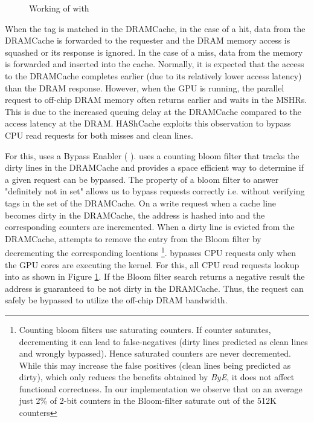 \begin{figure}[htb]
    \centering
    \scalebox{0.78}{\bloom}
    \caption{Working of \cachename with \bypassname }
    \label{fig:bye}
\end{figure}

When the tag is matched in the DRAMCache, in the case of a hit, data from the DRAMCache is forwarded to the requester and the DRAM memory access is squashed or its response is ignored. In the case of a miss, data from the memory is forwarded and inserted into the cache. Normally, it is expected that the access to the DRAMCache completes earlier (due to its relatively lower access latency) than the DRAM response. However, when the GPU is running, the parallel request to off-chip DRAM memory often returns earlier and waits in the MSHRs. This is due to the increased queuing delay at the DRAMCache compared to the access latency at the DRAM. HAShCache exploits this observation to bypass CPU read requests for both misses and clean lines.
\par For this, \cachename uses a Bypass Enabler ( \bypassname). \bypassname uses a counting bloom filter \cite{bloom,counting-bloom} that tracks the dirty lines in the DRAMCache and provides a space efficient way to determine if a given request can be bypassed. The property of a bloom filter to answer "definitely not in set" allows us to bypass requests correctly i.e. without verifying tags in the set of the DRAMCache. 
On a write request when a cache line becomes dirty in the DRAMCache, the address is hashed into \bypassname and the corresponding counters are incremented. When a dirty line is evicted from the DRAMCache, \bypassname attempts to remove the entry from the Bloom filter by decrementing the corresponding locations \footnote{Counting bloom filters use saturating counters. If counter saturates, decrementing it can lead to false-negatives (dirty lines predicted as clean lines and wrongly bypassed). Hence saturated counters are never decremented.  While this may increase the false positives (clean lines being predicted as dirty), which only reduces the benefits obtained by \textit{ByE}, it does not affect functional correctness. In our implementation we observe that on an average just 2\% of 2-bit counters in the Bloom-filter saturate out of the 512K counters}.
\bypassname bypasses CPU requests only when the GPU cores are executing the kernel. For this, all CPU read requests lookup into \bypassname as shown in Figure \ref{fig:bye}. If the Bloom filter search returns a  negative result the address is guaranteed to be not dirty in the DRAMCache. Thus, the request can safely be bypassed to utilize the off-chip DRAM bandwidth. 
